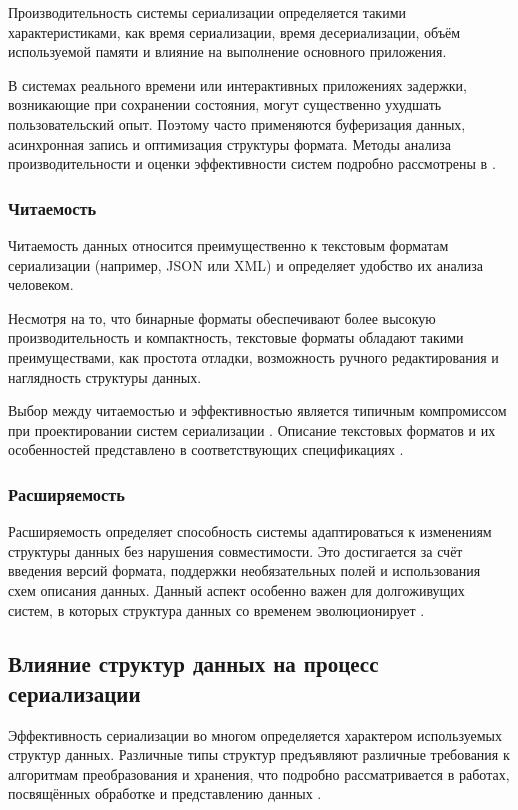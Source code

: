 \documentclass[coursework]{SCWorks}
\begin{document}
Производительность системы сериализации определяется такими характеристиками, как время сериализации, время десериализации, объём используемой памяти и влияние на выполнение основного приложения.

В системах реального времени или интерактивных приложениях задержки, возникающие при сохранении состояния, могут существенно ухудшать пользовательский опыт. Поэтому часто применяются буферизация данных, асинхронная запись и оптимизация структуры формата. Методы анализа производительности и оценки эффективности систем подробно рассмотрены в \cite{jain1991art, gregg2013systems}.

\subsubsection{Читаемость}

Читаемость данных относится преимущественно к текстовым форматам сериализации (например, JSON или XML) и определяет удобство их анализа человеком.

Несмотря на то, что бинарные форматы обеспечивают более высокую производительность и компактность, текстовые форматы обладают такими преимуществами, как простота отладки, возможность ручного редактирования и наглядность структуры данных.

Выбор между читаемостью и эффективностью является типичным компромиссом при проектировании систем сериализации \cite{kleppmann2017designing}. Описание текстовых форматов и их особенностей представлено в соответствующих спецификациях \cite{rfc8259, xmlspec, yamlspec}.

\subsubsection{Расширяемость}

Расширяемость определяет способность системы адаптироваться к изменениям структуры данных без нарушения совместимости. Это достигается за счёт введения версий формата, поддержки необязательных полей и использования схем описания данных. Данный аспект особенно важен для долгоживущих систем, в которых структура данных со временем эволюционирует \cite{protobuf, avro}.

\subsection{Влияние структур данных на процесс сериализации}

Эффективность сериализации во многом определяется характером используемых структур данных. Различные типы структур предъявляют различные требования к алгоритмам преобразования и хранения, что подробно рассматривается в работах, посвящённых обработке и представлению данных \cite{kleppmann2017designing, soukup1994serialization}.
\end{document}
